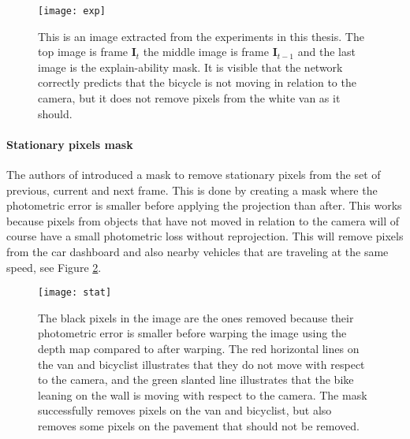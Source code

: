 \begin{figure}[H]
	\centering
	\texttt{[image: exp]}
	\caption{This is an image extracted from the experiments in this thesis. The top image is frame $\textbf{I}_t$ the middle image is frame $\textbf{I}_{t-1}$ and the last image is the explain-ability mask. It is visible that the network correctly predicts that the bicycle is not moving in relation to the camera, but it does not remove pixels from the white van as it should.}
	\label{fig:exp}
\end{figure}

\paragraph{Stationary pixels mask} The authors of \cite{monodepth2} introduced a mask to remove stationary pixels from the set of previous, current and next frame. This is done by creating a mask where the photometric error is smaller before applying the projection than after. This works because pixels from objects that have not moved in relation to the camera will of course have a small photometric loss without reprojection. This will remove pixels from the car dashboard and also nearby vehicles that are traveling at the same speed, see Figure \ref{fig:stat}.

\begin{figure}[H]
	\centering
	\texttt{[image: stat]}
	\caption{The black pixels in the image are the ones removed because their photometric error is smaller before warping the image using the depth map compared to after warping. The red horizontal lines on the van and bicyclist illustrates that they do not move with respect to the camera, and the green slanted line illustrates that the bike leaning on the wall is moving with respect to the camera. The mask successfully removes pixels on the van and bicyclist, but also removes some pixels on the pavement that should not be removed.}
	\label{fig:stat}
\end{figure}